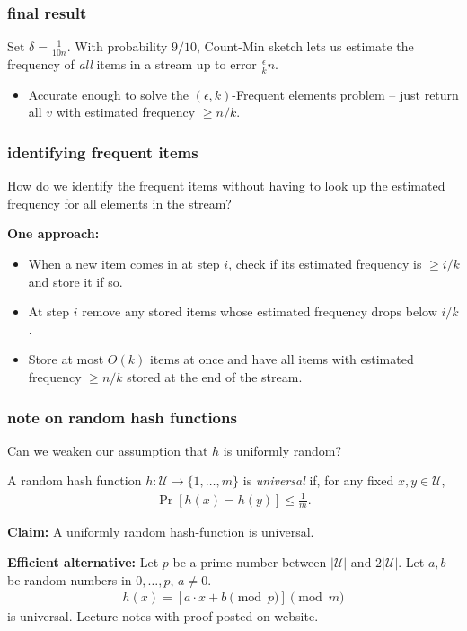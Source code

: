 \documentclass[]{beamer}
\begin{document}
\begin{frame}
		\frametitle{final result}
		Set $\delta = \frac{1}{10n}$. With probability $9/10$, Count-Min sketch lets us estimate the frequency of \emph{all} items in a stream up to error $\frac{\epsilon}{k}n$.
		\begin{itemize}
			\item Accurate enough to solve the $(\epsilon,k)$-Frequent elements problem -- just return all $v$ with estimated frequency $\geq n/k$.
		\end{itemize}
\end{frame}

	
	\begin{frame}
		\frametitle{identifying frequent items}
		How do we identify the frequent items without having to look up the estimated frequency for all elements in the stream? 
		
		\textbf{One approach:} 
		\begin{itemize}
			\item When a new item comes in at step $i$, check if its estimated frequency is $\ge i/k$ and store it if so.
			\item At step $i$ remove any stored items whose estimated frequency drops below $i/k$. 
			\item Store at most $O(k)$ items at once and have all items with estimated frequency $\ge n/k$ stored at the end of the stream.
		\end{itemize}
		
	\end{frame}
	
	\begin{frame}
		\frametitle{note on random hash functions}
		Can we weaken our assumption that $h$ is uniformly random?
		\begin{definition}
			A random hash function $h: \mathcal{U} \rightarrow \{1, \ldots, m\}$ is \emph{universal} if, for any fixed $x,y\in \mathcal{U}$,
			\begin{align*}
				\Pr[h(x) = h(y)] \leq \frac{1}{m}.
			\end{align*}
		\end{definition}
		\textbf{Claim:} A uniformly random hash-function is universal. 
		
		\textbf{Efficient alternative:} Let $p$ be a prime number between $|\mathcal{U}|$ and $2|\mathcal{U}|$. Let $a,b$ be random numbers in $0,\ldots, p$, $a\neq 0$.
		\begin{align*}
			h(x) = \left[a\cdot x + b \pmod{p}\right] \pmod{m}
		\end{align*} 
		is universal. Lecture notes with proof posted on website. 
	\end{frame}
	
\end{document}
